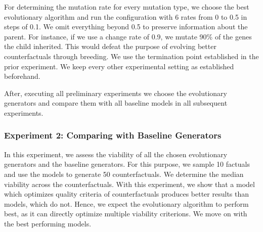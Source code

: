 \documentclass[./../../paper.tex]{subfiles}
\begin{document}

For determining the mutation rate for every mutation type, we choose the best evolutionary algorithm and run the configuration with 6 rates from 0 to 0.5 in steps of 0.1. We omit everything beyond 0.5 to preserve information about the parent. For instance, if we use a change rate of 0.9, we mutate 90\% of the genes the child inherited. This would defeat the purpose of evolving better counterfactuals through breeding. We use the termination point established in the prior experiment. We keep every other experimental setting as established beforehand. 

After, executing all preliminary experiments we choose the evolutionary generators and compare them with all baseline models in all subsequent experiments.






\subsubsection{Experiment 2: Comparing with Baseline Generators}
In this experiment, we assess the viability of all the chosen evolutionary generators and the baseline generators. For this purpose, we sample 10 factuals and use the models to generate 50 counterfactuals. We determine the median viability across the counterfactuals. With this experiment, we show that a model which optimizes quality criteria of counterfactuals produces better results than models, which do not. Hence, we expect the evolutionary algorithm to perform best, as it can directly optimize multiple viability criterions. We move on with the best performing models.


\end{document}
